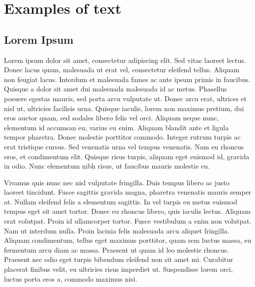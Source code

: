 
\chapter{Examples of text}

\ifpdf
    \graphicspath{{Chapter3/Figs/Raster/}{Chapter3/Figs/PDF/}{Chapter3/Figs/}}
\else
    \graphicspath{{Chapter3/Figs/Vector/}{Chapter3/Figs/}}
\fi

\section{Lorem Ipsum}

Lorem ipsum dolor sit amet, consectetur adipiscing elit. Sed vitae laoreet lectus. Donec lacus quam, malesuada ut erat vel, consectetur eleifend tellus. Aliquam non feugiat lacus. Interdum et malesuada fames ac ante ipsum primis in faucibus. Quisque a dolor sit amet dui malesuada malesuada id ac metus. Phasellus posuere egestas mauris, sed porta arcu vulputate ut. Donec arcu erat, ultrices et nisl ut, ultricies facilisis urna. Quisque iaculis, lorem non maximus pretium, dui eros auctor quam, sed sodales libero felis vel orci. Aliquam neque nunc, elementum id accumsan eu, varius eu enim. Aliquam blandit ante et ligula tempor pharetra. Donec molestie porttitor commodo. Integer rutrum turpis ac erat tristique cursus. Sed venenatis urna vel tempus venenatis. Nam eu rhoncus eros, et condimentum elit. Quisque risus turpis, aliquam eget euismod id, gravida in odio. Nunc elementum nibh risus, ut faucibus mauris molestie eu.

Vivamus quis nunc nec nisl vulputate fringilla. Duis tempus libero ac justo laoreet tincidunt. Fusce sagittis gravida magna, pharetra venenatis mauris semper at. Nullam eleifend felis a elementum sagittis. In vel turpis eu metus euismod tempus eget sit amet tortor. Donec eu rhoncus libero, quis iaculis lectus. Aliquam erat volutpat. Proin id ullamcorper tortor. Fusce vestibulum a enim non volutpat. Nam ut interdum nulla. Proin lacinia felis malesuada arcu aliquet fringilla. Aliquam condimentum, tellus eget maximus porttitor, quam sem luctus massa, eu fermentum arcu diam ac massa. Praesent ut quam id leo molestie rhoncus. Praesent nec odio eget turpis bibendum eleifend non sit amet mi. Curabitur placerat finibus velit, eu ultricies risus imperdiet ut. Suspendisse lorem orci, luctus porta eros a, commodo maximus nisi.


